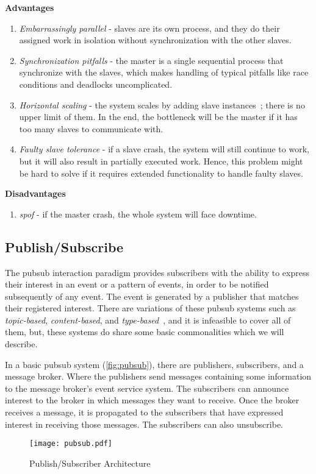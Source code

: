 \textbf{Advantages}
\begin{enumerate}
    \item \emph{Embarrassingly parallel} - slaves are its own process, and they do their assigned work in isolation without synchronization with the other slaves.
    
    \item \emph{Synchronization pitfalls} - the master is a single sequential process that synchronize with the slaves, which makes handling of typical pitfalls like race conditions and deadlocks uncomplicated.

    \item \emph{Horizontal scaling} - the system scales by adding slave instances~\cite{ms_hor}; there is no upper limit of them. In the end, the bottleneck will be the master if it has too many slaves to communicate with.
    
    \item \emph{Faulty slave tolerance} - if a slave crash, the system will still continue to work, but it will also result in partially executed work. Hence, this problem might be hard to solve if it requires extended functionality to handle faulty slaves.
\end{enumerate}

\textbf{Disadvantages}
\begin{enumerate}
    \item \emph{\Ac{spof}} - if the master crash, the whole system will face downtime.
\end{enumerate}


\subsection{Publish/Subscribe}
The \ac{pubsub} interaction paradigm provides subscribers with the ability to express their interest in an event or a pattern of events, in order to be notified subsequently of any event. The event is generated by a publisher that matches their registered interest. There are variations of these \ac{pubsub} systems such as \emph{topic-based}, \emph{content-based}, and \emph{type-based}~\cite{eugster2003many}, and it is infeasible to cover all of them, but, these systems do share some basic commonalities which we will describe.

In a basic \ac{pubsub} system (\autoref{fig:pubsub}), there are publishers, subscribers, and a message broker. Where the publishers send messages containing some information to the message broker's event service system. The subscribers can announce interest to the broker in which messages they want to receive. Once the broker receives a message, it is propagated to the subscribers that have expressed interest in receiving those messages. The subscribers can also unsubscribe.
\begin{figure}[ht]
    \centering
    \texttt{[image: pubsub.pdf]}
    \caption{Publish/Subscriber Architecture}
    \label{fig:pubsub}
\end{figure}

